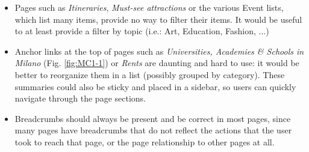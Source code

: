 \begin{itemize}
    \item Pages such as \emph{Itineraries}, \emph{Must-see attractions} or the various Event lists, which list many items, provide no way to filter their items. It would be useful to at least provide a filter by topic (i.e.: Art, Education, Fashion, ...)
    
    \item Anchor links at the top of pages such as \emph{Universities, Academies \& Schools in Milano} (Fig. \ref{fig:MC1-1}) or \emph{Rents} are daunting and hard to use: it would be better to reorganize them in a list (possibly grouped by category). These summaries could also be sticky and placed in a sidebar, so users can quickly navigate through the page sections.
    
    \item Breadcrumbs should always be present and be correct in most pages, since many pages have breadcrumbs that do not reflect the actions that the user took to reach that page, or the page relationship to other pages at all.
\end{itemize}
